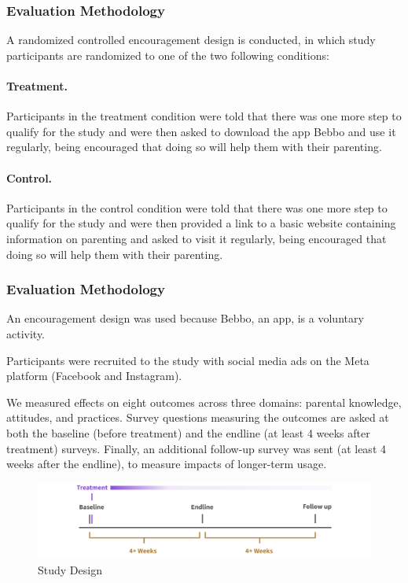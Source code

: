 \documentclass[aspectratio=169]{beamer}
\begin{document}
\begin{frame}
  \frametitle{Evaluation Methodology}

A randomized controlled encouragement design is conducted, in which study participants are randomized to one of the two following conditions: 

\paragraph{Treatment.} Participants in the treatment condition were told that there was one more step to qualify for the study and were then asked to download the app Bebbo and use it regularly, being encouraged that doing so will help them with their parenting. 

\paragraph{Control.} Participants in the control condition were told that there was one more step to qualify for the study and were then provided a link to a basic website containing information on parenting and asked to visit it regularly, being encouraged that doing so will help them with their parenting. 

\end{frame}

\begin{frame}
  \frametitle{Evaluation Methodology}

An encouragement design was used because Bebbo, an app, is a voluntary activity.

Participants were recruited to the study with social media ads on the Meta platform (Facebook and Instagram). 

We measured effects on eight outcomes across three domains: parental knowledge, attitudes, and practices. Survey questions measuring the outcomes are asked at both the baseline (before treatment) and the endline (at least 4 weeks after treatment) surveys. Finally, an additional follow-up survey was sent (at least 4 weeks after the endline), to measure impacts of longer-term usage. 
\end{frame}

\begin{frame}


  \begin{figure}[H]
\includegraphics[width=\textwidth]{images/design-timeline.png}
\caption{Study Design}
\label{fig:Study Design}
\end{figure}
\end{frame}
\end{document}
